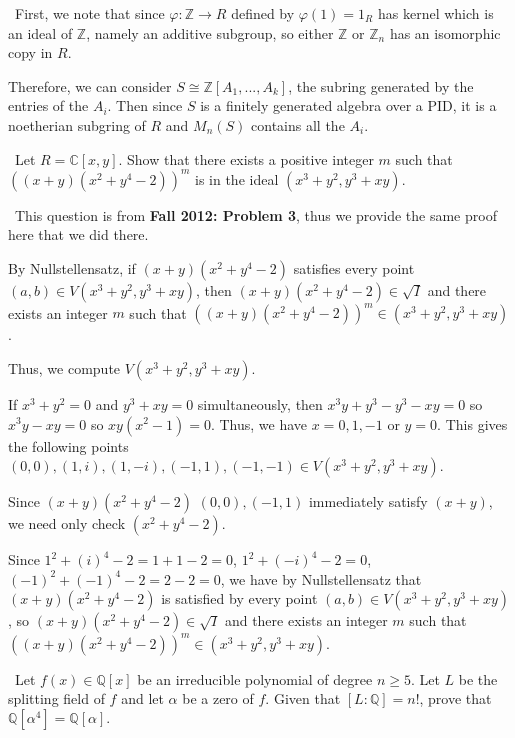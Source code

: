 \documentclass[12pt]{Qual}
\begin{document}
\begin{solution}$\,$
First, we note that since $\varphi:\mathbb{Z}\to R$ defined by $\varphi(1)=1_R$ has kernel which is an ideal of $\mathbb{Z}$, namely an additive subgroup, so either $\mathbb{Z}$ or $\mathbb{Z}_n$ has an isomorphic copy in $R$.

Therefore, we can consider $S\cong \mathbb{Z}[A_1,...,A_k]$, the subring generated by the entries of the $A_i$. Then since $S$ is a finitely generated algebra over a PID, it is a noetherian subgring of $R$ and $M_n(S)$ contains all the $A_i.$

\end{solution}
\newpage



\begin{problem} $\,$
Let $R=\mathbb{C}[x,y]$. Show that there exists a positive integer $m$ such that $((x+y)(x^2+y^4-2))^m$ is in the ideal $(x^3+y^2,y^3+xy)$.
\end{problem}


\begin{solution}$\,$
This question is from \textbf{Fall 2012: Problem 3}, thus we provide the same proof here that we did there.

By Nullstellensatz, if $(x+y)(x^2+y^4-2)$ satisfies every point $(a,b)\in V(x^3+y^2,y^3+xy)$, then $(x+y)(x^2+y^4-2)\in\sqrt{I}$ and there exists an integer $m$ such that $((x+y)(x^2+y^4-2))^m\in(x^3+y^2,y^3+xy)$.

Thus, we compute $V(x^3+y^2,y^3+xy).$

If $x^3+y^2=0$ and $y^3+xy=0$ simultaneously, then $x^3y+y^3-y^3-xy=0$ so $x^3y-xy=0$ so $xy(x^2-1)=0$. Thus, we have $x=0,1,-1$ or $y=0$. This gives the following points $(0,0),(1,i),(1,-i),(-1,1),(-1,-1)\in V(x^3+y^2,y^3+xy)$.

Since $(x+y)(x^2+y^4-2)$ $(0,0),(-1,1)$ immediately satisfy $(x+y)$, we need only check $(x^2+y^4-2)$.

Since $1^2+(i)^4-2=1+1-2=0$, $1^2+(-i)^4-2=0$, $(-1)^2+(-1)^4-2=2-2=0$, we have by Nullstellensatz that $(x+y)(x^2+y^4-2)$ is satisfied by every point $(a,b)\in V(x^3+y^2,y^3+xy)$, so $(x+y)(x^2+y^4-2)\in\sqrt{I}$ and there exists an integer $m$ such that $((x+y)(x^2+y^4-2))^m\in(x^3+y^2,y^3+xy)$.
\end{solution}
\newpage




\begin{problem} $\,$
Let $f(x)\in\mathbb{Q}[x]$ be an irreducible polynomial of degree $n\ge5$. Let $L$ be the splitting field of $f$ and let $\alpha$ be a zero of $f$. Given that $[L:\mathbb{Q}]=n!$, prove that $\mathbb{Q}[\alpha^4]=\mathbb{Q}[\alpha].$
\end{problem}
\end{document}
